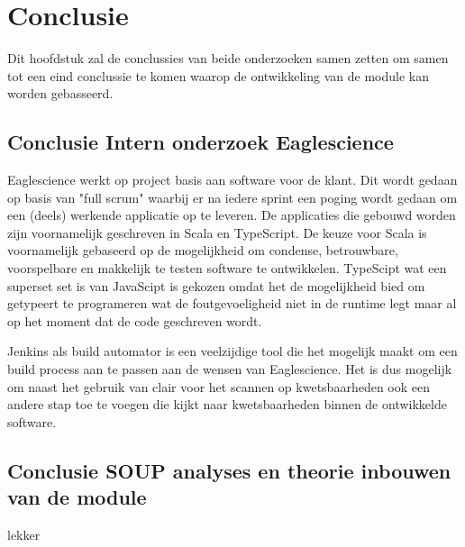 
\chapter{Conclusie} %

\label{ch:onderzoekConclusie} %

Dit hoofdstuk zal de conclussies van beide onderzoeken samen zetten om samen tot een eind conclussie te komen waarop de ontwikkeling van de module kan worden gebasseerd.

\section{Conclusie Intern onderzoek Eaglescience}
Eaglescience werkt op project basis aan software voor de klant. Dit wordt gedaan op basis van "full scrum" waarbij er na iedere sprint een poging wordt gedaan om een (deels) werkende applicatie op te leveren. De applicaties die gebouwd worden zijn voornamelijk geschreven in Scala en TypeScript. De keuze voor Scala is voornamelijk gebaseerd op de mogelijkheid om condense, betrouwbare, voorspelbare en makkelijk te testen software te ontwikkelen. TypeScipt wat een superset set is van JavaScipt is gekozen omdat het de mogelijkheid bied om getypeert te programeren wat de foutgevoeligheid niet in de runtime legt maar al op het moment dat de code geschreven wordt.

Jenkins als build automator is een veelzijdige tool die het mogelijk maakt om een build process aan te passen aan de wensen van Eaglescience. Het is dus mogelijk om naast het gebruik van clair voor het scannen op kwetsbaarheden ook een andere stap toe te voegen die kijkt naar kwetsbaarheden binnen de ontwikkelde software.

\section{Conclusie SOUP analyses en theorie inbouwen van de module}
lekker
\lipsum[01]
